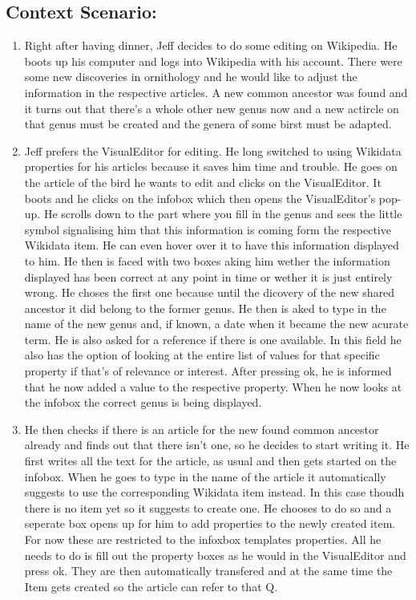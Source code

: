 \documentclass{article}
\begin{document}
\subsection{Context Scenario:}
\begin{enumerate}
\item Right after having dinner, Jeff decides to do some editing on Wikipedia. He boots up his computer and logs into Wikipedia with his account. There were some new discoveries in ornithology and he would like to adjust the information in the respective articles. A new common ancestor was found and it turns out that there's a whole other new genus now and a new actircle on that genus must be created and the genera of some birst must be adapted. 
\item Jeff prefers the VisualEditor for editing. He long switched to using Wikidata properties for his articles because it saves him time and trouble. He goes on the article of the bird he wants to edit and clicks on the VisualEditor. It boots and he clicks on the infobox which then opens the VisualEditor's pop-up. He scrolls down to the part where you fill in the genus and sees the little symbol signalising him that this information is coming form the respective Wikidata item. He can even hover over it to have this information displayed to him. He then is faced with two boxes aking him wether the information displayed has been correct at any point in time or wether it is just entirely wrong. He choses the first one because until the dicovery of the new shared ancestor it did belong to the former genus. He then is aked to type in the name of the new genus and, if known, a date when it became the new acurate term. He is also asked for a reference if there is one available. In this field he also has the option of looking at the entire list of values for that specific property if that's of relevance or interest. After pressing ok, he is informed that he now added a value to the respective property. When he now looks at the infobox the correct genus is being displayed. 
\item He then checks if there is an article for the new found common ancestor already and finds out that there isn't one, so he decides to start writing it. He first writes all the text for the article, as usual and then gets started on the infobox. When he goes to type in the name of the article it automatically suggests to use the corresponding Wikidata item instead. In this case thoudh there is no item yet so it suggests to create one. He chooses to do so and a seperate box opens up for him to add properties to the newly created item. For now these are restricted to the infoxbox templates properties. All he needs to do is fill out the property boxes as he would in the VisualEditor and press ok. They are then automatically transfered and at the same time the Item gets created so the article can refer to that Q.

\end{enumerate}
\end{document}

